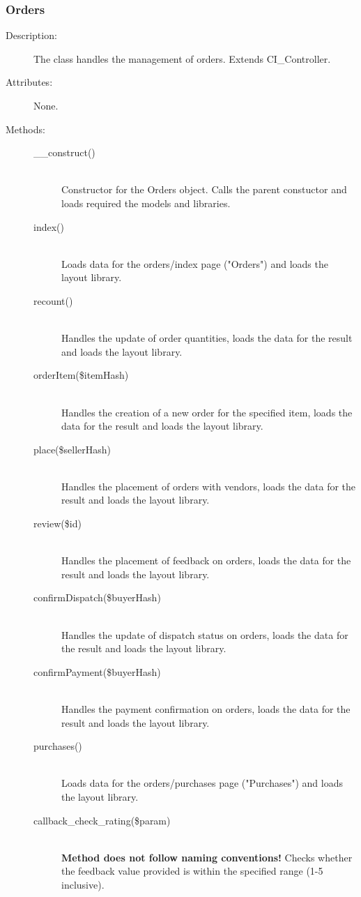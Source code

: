 \documentclass[11pt]{article} %
\begin{document}
\subsubsection{Orders}
\begin{description}
\item[Description:] The class handles the management of orders. Extends CI\_Controller.
\item[Attributes:] None.
\item[Methods:] \textbf{ }
\begin{description}
\item[\_\_construct()]  \textbf{ }\\
Constructor for the Orders object. Calls the parent constuctor and loads required the models and libraries.
\item[index()]  \textbf{ }\\
Loads data for the orders/index page ("Orders") and loads the layout library.
\item[recount()]  \textbf{ }\\
Handles the update of order quantities, loads the data for the result and loads the layout library.
\item[orderItem(\$itemHash)]  \textbf{ }\\
Handles the creation of a new order for the specified item, loads the data for the result and loads the layout library.
\item[place(\$sellerHash)]  \textbf{ }\\
Handles the placement of orders with vendors, loads the data for the result and loads the layout library.
\item[review(\$id)]  \textbf{ }\\
Handles the placement of feedback on orders, loads the data for the result and loads the layout library.
\item[confirmDispatch(\$buyerHash)]  \textbf{ }\\
Handles the update of dispatch status on orders, loads the data for the result and loads the layout library.
\item[confirmPayment(\$buyerHash)]  \textbf{ }\\
Handles the payment confirmation on orders, loads the data for the result and loads the layout library.
\item[purchases()]  \textbf{ }\\
Loads data for the orders/purchases page ("Purchases") and loads the layout library.
\item[callback\_check\_rating(\$param)]  \textbf{ }\\
\textbf{Method does not follow naming conventions!} Checks whether the feedback value provided is within the specified range (1-5 inclusive).
\end{description} 
\end{description} 
\end{document}
